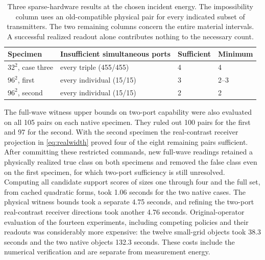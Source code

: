 \begin{table}[tb]\centering
\caption{Three sparse-hardware results at the chosen incident energy. The impossibility column uses an old-compatible physical pair for every indicated subset of transmitters. The two remaining columns concern the entire material intervals. A successful realized readout alone contributes nothing to the necessary count.}\label{tab:ports}
\small\begin{tabular}{@{}llll@{}}\toprule
Specimen & Insufficient simultaneous ports & Sufficient & Minimum\\\midrule
$32^2$, case three & every triple (455/455) & 4 & 4\\
$96^2$, first & every individual (15/15) & 3 & 2--3\\
$96^2$, second & every individual (15/15) & 2 & 2\\\bottomrule
\end{tabular}
\end{table}

The full-wave witness upper bounds on two-port capability were also evaluated on all 105 pairs on each native specimen. They ruled out 100 pairs for the first and 97 for the second. With the second specimen the real-contrast receiver projection in \eqref{eq:realwidth} proved four of the eight remaining pairs sufficient. After committing these restricted commands, new full-wave readings retained a physically realized true class on both specimens and removed the false class even on the first specimen, for which two-port sufficiency is still unresolved. Computing all candidate support scores of sizes one through four and the full set, from cached quadratic forms, took 1.06 seconds for the two native cases. The physical witness bounds took a separate 4.75 seconds, and refining the two-port real-contrast receiver directions took another 4.76 seconds. Original-operator evaluation of the fourteen experiments, including competing policies and their readouts was considerably more expensive: the twelve small-grid objects took 38.3 seconds and the two native objects 132.3 seconds. These costs include the numerical verification and are separate from measurement energy.
